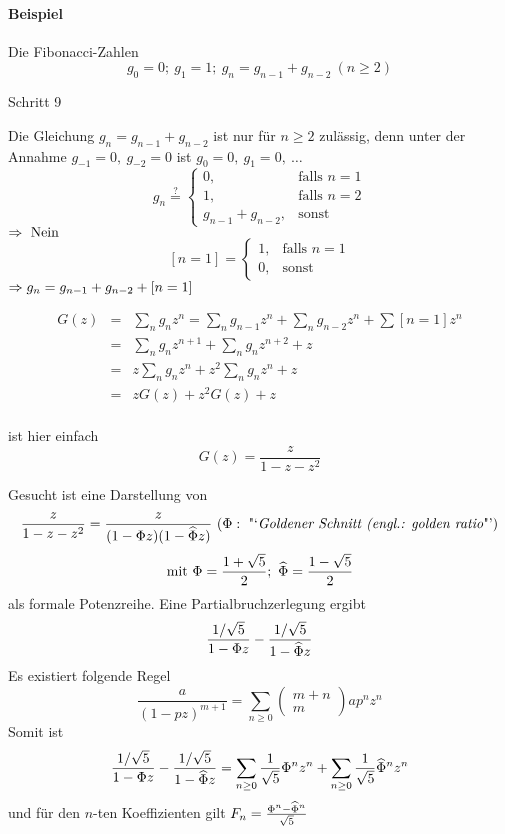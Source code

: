 \documentclass[a4paper]{scrartcl}
\begin{document}
\paragraph{Beispiel} Die Fibonacci-Zahlen
$$g_0=0;\ g_1=1;\ g_n=g_{n-1}+g_{n-2}\ (n \geq 2)$$

\begin{labeling}[:]{Schritt 9}
\item[Schritt 1] Die Gleichung $g_n=g_{n-1}+g_{n-2}$ ist nur für $n \geq 2$ zulässig, denn unter der Annahme $g_{-1}=0,\ g_{-2}=0$ ist
      $g_0=0,\ g_1=0,\ \ldots$
      \[
      	g_n \stackrel{?}{=} \begin{cases}
      	0,& \text{falls $n=1$} \\
      	1,& \text{falls $n=2$} \\
      	g_{n-1}+g_{n-2},& \text{sonst}
      \end{cases}\]
      $\Rightarrow \text{ Nein}$
      \[ \left[ n=1 \right] =
      \begin{cases}
      	1,& \text{falls $n=1$} \\
      	0,& \text{sonst}
      \end{cases}\]
      $\Rightarrow g_n=g_{n-1}+g_{n-2} + \left[ n=1 \right]$
\item[Schritt 2]
	\begin{eqnarray*}
			G(z) & = & \sum_ng_nz^n = \sum_ng_{n-1}z^n + \sum_ng_{n-2}z^n + \sum [n=1]z^n \\
			     & = & \sum_ng_nz^{n+1} + \sum_ng_nz^{n+2} + z \\
			     & = & z\sum_ng_nz^n + z^2\sum_ng_nz^n + z \\
			     & = & zG(z) + z^2G(z) + z \\
	\end{eqnarray*}
\item[Schritt 3] ist hier einfach
      $$G(z) = \frac{z}{1-z-z^2}$$
\item[Schritt 4] Gesucht ist eine Darstellung von      
      $$\frac{z}{1-z-z^2}=\frac{z}{(1-\Phi z)(1-\widehat{\Phi}z)}\ (\Phi: \text{ "`\textit{Goldener Schnitt (engl.: golden ratio}"'})$$
			$$\text{mit }\Phi = \frac{1+\sqrt{5}}{2};\ \widehat{\Phi} = \frac{1-\sqrt{5}}{2}$$
			als formale Potenzreihe. Eine Partialbruchzerlegung ergibt			
			$$\frac{1/\sqrt{5}}{1-\Phi z} - \frac{1/\sqrt{5}}{1-\widehat{\Phi}z}$$
			Es existiert folgende Regel
			$$\frac{a}{(1-pz)^{m+1}} = \sum_{n \geq 0} \left(\begin{array}{c}m+n\\m\end{array}\right)ap^nz^n$$
			Somit ist 
			$$\frac{1/\sqrt{5}}{1-\Phi z} - \frac{1/\sqrt{5}}{1-\widehat{\Phi}z} = 
			\sum_{n \geq 0}\frac{1}{\sqrt{5}}\Phi^nz^n + \sum_{n \geq 0}\frac{1}{\sqrt{5}}\widehat{\Phi}^nz^n$$
			und für den $n$-ten Koeffizienten gilt
			$F_n = \frac{\Phi^n - \widehat{\Phi}^n}{\sqrt{5}}$
\end{labeling}
\end{document}
